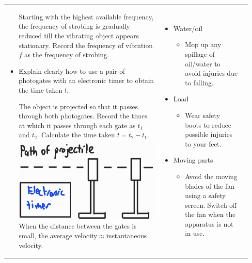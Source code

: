 \documentclass[oneside]{book}
\begin{document}
\begin{longtable}{M{0.1\textwidth}m{0.4\textwidth}m{0.4\textwidth}}
\begin{itemize}
        Starting with the highest available frequency, the frequency of strobing is gradually reduced till the vibrating object appears stationary. Record the frequency of vibration \(f\) as the frequency of strobing.  
        \item[\textcolor{green!70!black}{\checkmark}] Explain clearly how to use a pair of photogates with an electronic timer to obtain the time taken \(t\).

        The object is projected so that it passes through both photogates. Record the times at which it passes through each gate as \(t_1\) and \(t_2\). Calculate the time taken \(t=t_2-t_1\).
        \includegraphics[width=\linewidth]{../images/electronic-timer-light-gates.jpg}
        When the distance between the gates is small, the average velocity\({}\approx{}\)instantaneous velocity.
    \end{itemize}
    & 
    \begin{itemize}
        \item Water/oil
        \begin{itemize}
            \item[\textcolor{green!70!black}{\checkmark}] Mop up any spillage of oil/water to avoid injuries due to falling.
        \end{itemize}
        \item Load
        \begin{itemize}
            \item[\textcolor{green!70!black}{\checkmark}] Wear safety boots to reduce possible injuries to your feet.
        \end{itemize}
        \item Moving parts
        \begin{itemize}
            \item[\textcolor{green!70!black}{\checkmark}] Avoid the moving blades of the fan using a safety screen. Switch off the fan when the apparatus is not in use. 

\end{itemize}
\end{itemize}
\end{longtable}
\end{document}
